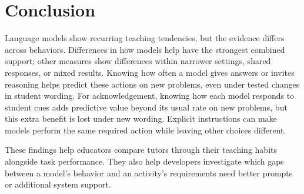 \section{Conclusion}

Language models show recurring teaching tendencies, but the evidence differs
across behaviors. Differences in how models help have the strongest combined support; other
measures show differences within narrower settings, shared responses, or mixed
results. Knowing how often a model gives answers or invites reasoning helps
predict these actions on new problems, even under tested changes in student
wording. For acknowledgement, knowing how each model responds to student cues
adds predictive value beyond its usual rate on new problems, but this extra
benefit is lost under new wording. Explicit instructions can make models perform
the same required action while leaving other choices different.

These findings help educators compare tutors through their teaching habits
alongside task performance. They also help developers investigate which gaps
between a model's behavior and an activity's requirements need better prompts
or additional system support.
